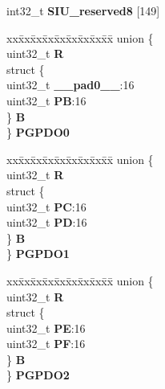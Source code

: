 \begin{DoxyCompactItemize}
\begin{tabbing}
\end{tabbing}\item 
\mbox{\label{structSIU__tag_aeaec0205d540200f5efee3c85a028205}} 
int32\+\_\+t {\bfseries S\+I\+U\+\_\+reserved8} \mbox{[}149\mbox{]}
\item 
\mbox{\label{structSIU__tag_a2a62a4e9cf53b5919f5fb4d850ba7c65}} 
\begin{tabbing}
xx\=xx\=xx\=xx\=xx\=xx\=xx\=xx\=xx\=\kill
union \{\\
\>uint32\_t {\bfseries R}\\
\>struct \{\\
\>\>uint32\_t {\bfseries \_\_pad0\_\_}:16\\
\>\>uint32\_t {\bfseries PB}:16\\
\>\} {\bfseries B}\\
\} {\bfseries PGPDO0}\\

\end{tabbing}\item 
\mbox{\label{structSIU__tag_af1a9498db25e4fe3c27bdc424e81eb3a}} 
\begin{tabbing}
xx\=xx\=xx\=xx\=xx\=xx\=xx\=xx\=xx\=\kill
union \{\\
\>uint32\_t {\bfseries R}\\
\>struct \{\\
\>\>uint32\_t {\bfseries PC}:16\\
\>\>uint32\_t {\bfseries PD}:16\\
\>\} {\bfseries B}\\
\} {\bfseries PGPDO1}\\

\end{tabbing}\item 
\mbox{\label{structSIU__tag_a55884b7c6e54e1385a2802b0fd0a3b9e}} 
\begin{tabbing}
xx\=xx\=xx\=xx\=xx\=xx\=xx\=xx\=xx\=\kill
union \{\\
\>uint32\_t {\bfseries R}\\
\>struct \{\\
\>\>uint32\_t {\bfseries PE}:16\\
\>\>uint32\_t {\bfseries PF}:16\\
\>\} {\bfseries B}\\
\} {\bfseries PGPDO2}\\


\end{tabbing}
\end{DoxyCompactItemize}
